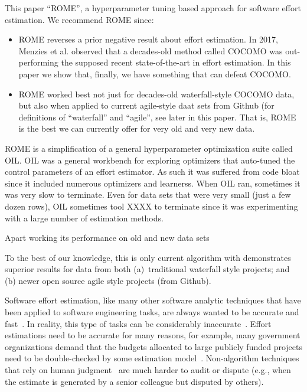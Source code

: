 \documentclass[sigconf,review]{acmart}
\newcommand{\bi}{\begin{itemize}}
\newcommand{\ei}{\end{itemize}}
\begin{document}
This paper  ``ROME'', a hyperparameter tuning based approach for software effort estimation. We recommend ROME since:
\bi
\item
ROME reverses
a prior negative result about effort estimation. In 2017, Menzies et al. observed that  a decades-old method
called COCOMO was out-performing the supposed recent state-of-the-art in effort estimation. In this paper we show that,
finally, we have something that can defeat COCOMO.
\item
ROME worked best not just for decades-old waterfall-style COCOMO data, but also when applied to current agile-style daat sets from Github (for definitions
of ``waterfall'' and ``agile'', see later in this paper.
That is, ROME is the best we can currently offer for very old and very new data.
\ei
ROME is a simplification of a general hyperparameter optimization suite called OIL. OIL was a general 
workbench for exploring optimizers that auto-tuned the control parameters of an effort estimator.
As such it was suffered from code bloat since it included numerous optimizers and learnerss. 
When OIL ran, sometimes it was very slow to terminate. Even for data sets that were very
small (just a few dozen rows), OIL sometimes tool XXXX to terminate since it was experimenting with a large
number of estimation methods. 

Apart working its performance on old and new data sets

To the best of our knowledge, this
is only current algorithm with demonstrates superior results for data from both (a)~traditional waterfall style projects;
and (b) newer  open source agile style projects (from Github).


Software effort estimation, like many other software analytic techniques that have been applied to software engineering tasks, are always wanted to be accurate and fast~\cite{menzies2018software,nam2018heterogeneous}. 
In reality, this type of tasks can be 
considerably inaccurate~\cite{kemerer1987empirical}.  Effort estimations need to be accurate for many reasons, for example, many government organizations demand that the budgets allocated to large publicly funded projects need to be double-checked by some estimation model~\cite{MenziesNeg:2017}.  
Non-algorithm techniques that rely on human judgment~\cite{jorgensen2004review} are much harder to  
audit or 
dispute (e.g.,  when the estimate is generated by a senior colleague but disputed by others). 
\end{document}
